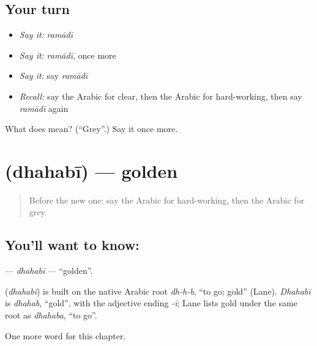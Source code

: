 \subsection*{Your turn}
\begin{itemize}
\raggedright
  \item \emph{Say it:} \emph{ramādī}
  \item \emph{Say it:} \emph{ramādī}, once more
  \item \emph{Say it:} say \emph{ramādī}
  \item \emph{Recall:} say the Arabic for clear, then the Arabic for hard-working, then say \emph{ramādī} again
\end{itemize}

\begin{tcolorbox}[breakable,colback=teal!4,colframe=teal!35!black,title={Before you move on}]
What does  mean? (\textquotedblleft{}Grey\textquotedblright{}.) Say it once more.
\end{tcolorbox}
\section[\texorpdfstring{\ar{ذهبي} (dhahabī)}{ذهبي (dhahabī)}]{ (dhahabī) — golden}

\label{lesson:AR-C179-dhahabi}



\begin{quote}
Before the new one: say the Arabic for hard-working, then the Arabic for grey.
\end{quote}

\subsection*{You'll want to know: }
\textbf{} — \emph{dhahabī} — \textquotedblleft{}golden\textquotedblright{}.

\begin{cousinweb}
\textbf{} (\emph{dhahabī}) is built on the native Arabic root \emph{dh-h-b}, \textquotedblleft{}to go; gold\textquotedblright{} (Lane). \emph{Dhahabī} is \emph{dhahab}, \textquotedblleft{}gold\textquotedblright{}, with the adjective ending \emph{-ī}; Lane lists gold under the same root as \emph{dhahaba}, \textquotedblleft{}to go\textquotedblright{}.
\end{cousinweb}

\begin{grammarlens}[title={What you've built}]
One more word for this chapter.
\end{grammarlens}

